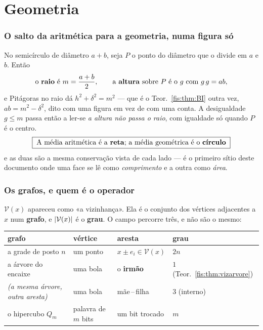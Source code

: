 \documentclass[livro.tex]{subfiles}
\begin{document}
\part{Geometria}

\section{O salto da aritmética para a geometria, numa figura só}\label{fis:semicirculo}

\noindent No semicírculo de diâmetro $a+b$, seja $P$ o ponto do diâmetro que o
divide em $a$ e $b$. Então
\[
\text{o \textbf{raio} é }m=\frac{a+b}{2},
\qquad
\text{a \textbf{altura} sobre }P\text{ é o }g\text{ com }g\,g=ab,\]
e Pitágoras no raio dá $h^{2}+\delta^{2}=m^{2}$ --- que é o
Teor.~\ref{fis:thm:BI} outra vez, $ab=m^{2}-\delta^{2}$, dito com uma figura em
vez de com uma conta. A desigualdade $g\le m$ passa então a ler-se \emph{a altura
não passa o raio}, com igualdade só quando $P$ é o centro.
\[
\boxed{\;\text{A média aritmética é a \textbf{reta}; a média geométrica é o
\textbf{círculo}}\;}
\]
e as duas são a mesma conservação vista de cada lado --- é o primeiro sítio deste
documento onde uma face se lê como \emph{comprimento} e a outra como \emph{área}.

\section{Os grafos, e quem é o operador}\label{fis:hipercubo}

\noindent $\mathcal{V}(x)$ apareceu como «a vizinhança». Ela é o conjunto dos
vértices adjacentes a $x$ num \textbf{grafo}, e $\lvert \mathcal{V}(x)\rvert$ é o
\textbf{grau}. O campo percorre três, e não são o mesmo:

\begin{center}\small
\begin{tabular}{@{}llll@{}}
\toprule
grafo & vértice & aresta & grau \\
\midrule
a grade de posto $n$ & um ponto & $x\pm e_i\in\mathcal{V}(x)$ & $2n$ \\
a árvore do encaixe & uma bola & o \textbf{irmão} & $1$ (Teor.~\ref{fis:thm:vizarvore}) \\
\quad\emph{(a mesma árvore, outra aresta)} & uma bola & mãe\,--\,filha & $3$ (interno) \\o hipercubo $Q_m$ & palavra de $m$ bits & um bit trocado & $m$ \\
\bottomrule
\end{tabular}
\end{center}
\end{document}
